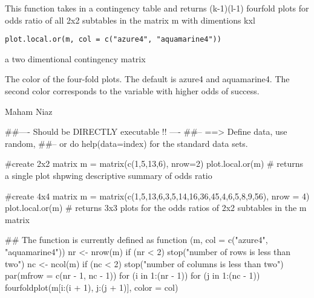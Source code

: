 \documentclass[letterpaper]{book}
\begin{document}
%
\begin{Description}\relax
This function takes in a contingency table and returns (k-1)(l-1) fourfold plots for odds ratio of all 2x2 subtables in the matrix 
m with dimentions kxl 
\end{Description}
%
\begin{Usage}
\begin{verbatim}
plot.local.or(m, col = c("azure4", "aquamarine4"))
\end{verbatim}
\end{Usage}
%
\begin{Arguments}
\begin{ldescription}
\item[\code{m}] 
a two dimentional contingency matrix

\item[\code{col}] 
The color of the four-fold plots. The default is azure4 and aquamarine4. The second color corresponds to the 
variable with higher odds of success.

\end{ldescription}
\end{Arguments}
%
\begin{Author}\relax
Maham Niaz
\end{Author}
%
\begin{Examples}
\begin{ExampleCode}
##---- Should be DIRECTLY executable !! ----
##-- ==>  Define data, use random,
##--	or do  help(data=index)  for the standard data sets.

  #create 2x2 matrix
  m = matrix(c(1,5,13,6), nrow=2)
  plot.local.or(m) # returns a single plot shpwing descriptive summary of odds ratio
  
  #create 4x4 matrix
  m = matrix(c(1,5,13,6,3,5,14,16,36,45,4,6,5,8,9,56), nrow = 4)
  plot.local.or(m) # returns 3x3 plots for the odds ratios of 2x2 subtables in the m matrix
  
## The function is currently defined as
function (m, col = c("azure4", "aquamarine4")) 
{
    nr <- nrow(m)
    if (nr < 2) 
        stop("number of rows is less than two")
    nc <- ncol(m)
    if (nc < 2) 
        stop("number of columns is less than two")
    par(mfrow = c(nr - 1, nc - 1))
    for (i in 1:(nr - 1)) for (j in 1:(nc - 1)) {
        fourfoldplot(m[i:(i + 1), j:(j + 1)], color = col)
    }
  }
\end{ExampleCode}
\end{Examples}
\printindex{}
\end{document}
